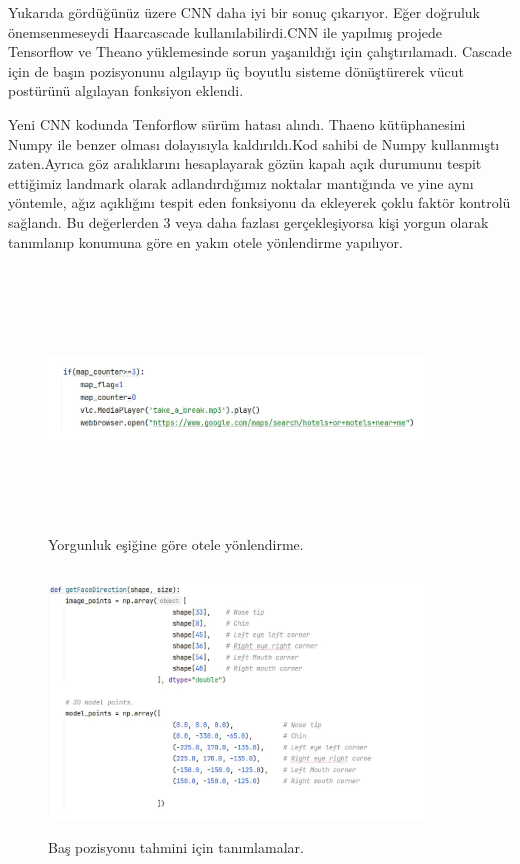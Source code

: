 \documentclass[12pt, a4paper]{article}
\begin{document}
	Yukarıda gördüğünüz üzere CNN daha iyi bir sonuç çıkarıyor. Eğer doğruluk önemsenmeseydi Haarcascade kullanılabilirdi.CNN ile yapılmış projede Tensorflow ve Theano yüklemesinde sorun yaşanıldığı için çalıştırılamadı. Cascade için de başın pozisyonunu algılayıp üç boyutlu sisteme dönüştürerek vücut postürünü algılayan fonksiyon eklendi.\par 
	Yeni CNN kodunda Tenforflow sürüm hatası alındı. Thaeno kütüphanesini Numpy ile benzer olması dolayısıyla kaldırıldı.Kod sahibi de Numpy kullanmıştı zaten.Ayrıca göz aralıklarını hesaplayarak gözün kapalı açık durumunu tespit ettiğimiz landmark olarak adlandırdığımız noktalar mantığında ve yine aynı yöntemle, ağız açıklığını tespit eden fonksiyonu da ekleyerek çoklu faktör kontrolü sağlandı. Bu değerlerden 3 veya daha fazlası gerçekleşiyorsa kişi yorgun olarak tanımlanıp konumuna göre en yakın otele yönlendirme yapılıyor.\newpage
	\begin{figure}
		\centering
		\includegraphics[width=10cm, height=7cm, keepaspectratio]{otel.jpg}
		\caption{Yorgunluk eşiğine göre otele yönlendirme\cite{superthinking}.}
	\end{figure} 
	\begin{figure}
		\centering
		\includegraphics[width=10cm, height=7cm, keepaspectratio]{bastanimlama.jpg}
		\caption{Baş pozisyonu tahmini için tanımlamalar\cite{superthinking}.}
	\end{figure}
\end{document}
